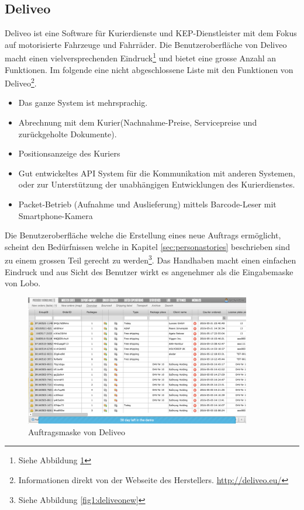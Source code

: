 \subsection{Deliveo}
Deliveo ist eine Software für Kurierdienste und KEP-Dienstleister mit dem Fokus auf motorisierte Fahrzeuge und Fahrräder. Die Benutzeroberfläche von Deliveo macht einen vielversprechenden Eindruck\footnote{Siehe Abbildung \ref{fig1:deliveomask}} und bietet eine grosse Anzahl an Funktionen. Im folgende eine nicht abgeschlossene Liste mit den Funktionen von Deliveo\footnote{ Informationen direkt von der Webseite des Herstellers. \url{http://deliveo.eu/}}.
\begin{itemize}
	\item Das ganze System ist mehrsprachig.
	\item Abrechnung mit dem Kurier(Nachnahme-Preise, Servicepreise und zurückgeholte Dokumente).
	\item Positionsanzeige des Kuriers
	\item Gut entwickeltes API System für die Kommunikation mit anderen Systemen, oder zur Unterstützung der unabhängigen Entwicklungen des Kurierdienstes.
	\item Packet-Betrieb (Aufnahme und Auslieferung) mittels Barcode-Leser mit Smartphone-Kamera
\end{itemize}
Die Benutzeroberfläche welche die Erstellung eines neue Auftrags ermöglicht, scheint den Bedürfnissen welche in Kapitel \ref{sec:personastories} beschrieben sind zu einem grossen Teil gerecht zu werden\footnote{Siehe Abbildung \ref{fig1:deliveonew}}. Das Handhaben macht einen einfachen Eindruck und aus Sicht des Benutzer wirkt es angenehmer als die Eingabemaske von Lobo.

\begin{figure}[ht]
	\centering
  \includegraphics[width=0.88\textwidth]{images/deliveo.png}
	\caption{Auftragsmaske von Deliveo}
	\label{fig1:deliveomask}
\end{figure}

